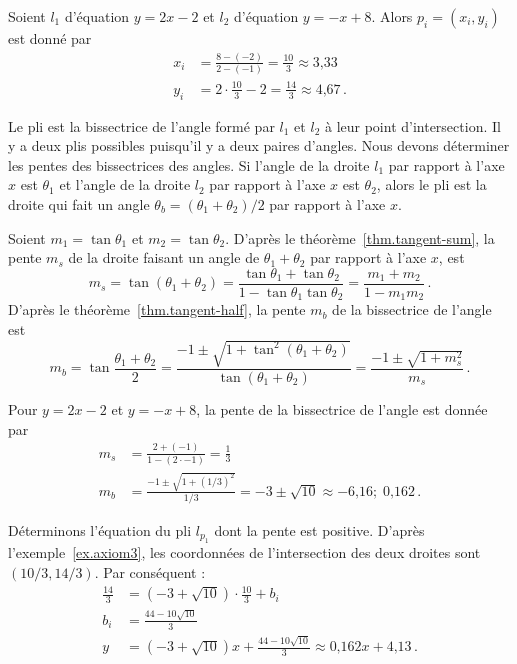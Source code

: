 \begin{example}\label{ex.axiom3}
Soient $l_1$ d'équation $y=2x-2$ et $l_2$ d'équation $y=-x+8$. Alors $p_i=(x_i,y_i)$ est donné par
\begin{align*}
x_i&=\frac{8-(-2)}{2-(-1)}=\frac{10}{3}\approx \mbox{3,33}\\
y_i &= 2\cdot\frac{10}{3}-2=\frac{14}{3}\approx \mbox{4,67}\,.
\end{align*}
\end{example}


Le pli est la bissectrice de l'angle formé par $l_1$ et $l_2$ à leur point d'intersection. Il y a deux plis possibles puisqu'il y a deux paires d'angles. Nous devons déterminer les pentes des bissectrices des angles. Si l'angle de la droite $l_1$ par rapport à l'axe $x$ est $\theta_1$ et l'angle de la droite $l_2$ par rapport à l'axe $x$ est $\theta_2$, alors le pli est la droite qui fait un angle  $\theta_b=(\theta_1+\theta_2)/2$ par rapport à l'axe $x$.

Soient $m_1=\tan\theta_1$ et $m_2=\tan \theta_2$. D'après le théorème~\ref{thm.tangent-sum},  la pente $m_s$ de la droite faisant un angle de $\theta_1+\theta_2$ par rapport à l'axe $x$, est 
\[
m_s=\tan(\theta_1+\theta_2)= \frac{\tan\theta_1+\tan\theta_2}{1-\tan\theta_1\tan\theta_2}=\frac{m_1+m_2}{1-m_1m_2}\,.
\]
D'après le théorème~\ref{thm.tangent-half},  la pente $m_b$ de la bissectrice de l'angle est 
\[
m_b= \tan\frac{\theta_1+\theta_2}{2}=\frac{-1\pm\sqrt{1+\tan^2(\theta_1+\theta_2)}}{\tan (\theta_1+\theta_2)}=\frac{-1\pm\sqrt{1+m_s^2}}{m_s}\,.
\]
\begin{example}
Pour $y=2x-2$ et $y=-x+8$, la pente de la bissectrice de l'angle est donnée par
%
\begin{align*}
m_s&=\frac{2+(-1)}{1-(2 \cdot -1)}=\frac{1}{3}\\
m_b&=\frac{-1\pm\sqrt{1+(1/3)^2}}{1/3}=-3\pm \sqrt{10}\approx -\mbox{6,16};\; \mbox{0,162}\,.
\end{align*}
\end{example}

Déterminons l'équation du pli $l_{p_1}$ dont la pente est positive. D'après l'exemple~\ref{ex.axiom3}, les coordonnées de l'intersection des deux droites sont $(10/3, 14/3)$. Par conséquent :
\begin{align*}
\frac{14}{3} &= (-3+\sqrt{10}) \cdot \frac{10}{3} + b_i\\ b_i&=\frac{44-10\sqrt{10}}{3}\\
y&= (-3+\sqrt{10})x + \frac{44-10\sqrt{10}}{3}\approx \mbox{0,162}x+\mbox{4,13}\,.
\end{align*}

